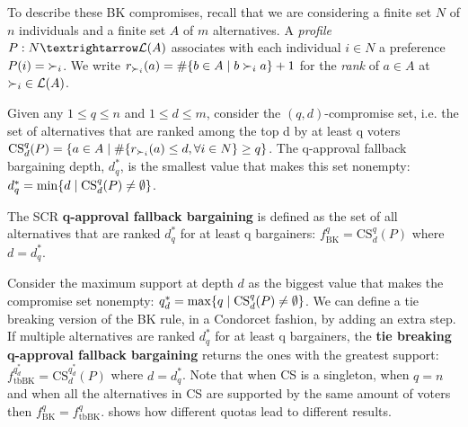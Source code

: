 To describe these BK compromises, recall that we are considering a finite set $N$ of $n$ individuals and a finite set $A$ of $m$ alternatives. A \emph{profile} $P: N → \linors$ associates with each individual $i \in N$ a preference $P(i) = {\prefi}$.
We write $r_{\prefi}(a)=\#\{b\in A \suchthat b \prefi a\}+1$ for the \emph{rank} of $a\in A$ at ${\prefi} \in \linors$.

Given any $ 1 \leq q \leq n$ and $1 \leq d \leq m$, consider the $(q, d)$-compromise set, i.e. the set of alternatives that are ranked among the top d by at least q voters $\text{CS}^{q}_{d}(P)=\{a \in A \suchthat \#\{r_{\prefi}(a) \leq d, \forall i \in N\} \geq q \}$.
The q-approval fallback bargaining depth, $d_{q}^{*}$, is the smallest value that makes this set nonempty: $d_{q}^{*}=\min\{d \suchthat \text{CS}^{q}_{d}(P) \neq \emptyset\}$.

The \acs{SCR} \textbf{q-approval fallback bargaining} is defined as the set of all alternatives that are ranked $d_{q}^{*}$ for at least q bargainers: $f_{\text{BK}}^{q}=\text{CS}^{q}_{d}(P)$ where $d=d_{q}^{*}$.

Consider the maximum support at depth $d$ as the biggest value that makes the compromise set nonempty: $q_{d}^{*}=\max\{q \suchthat \text{CS}^{q}_{d}(P) \neq \emptyset\}$.
We can define a tie breaking version of the BK rule, in a Condorcet fashion, by adding an extra step. If multiple alternatives are ranked $d_{q}^{*}$ for at least q bargainers, the \textbf{tie breaking q-approval fallback bargaining} returns the ones with the greatest support: $f_{\text{tbBK}}^{q_{d}^{*}}= \text{CS}^{q_{d}^{*}}_{d}(P)$ where $d=d_{q}^{*}$.
Note that when CS is a singleton, when $q=n$ and when all the alternatives in CS are supported by the same amount of voters then $f_{\text{BK}}^{q}=f_{\text{tbBK}}^{q}$.
 shows how different quotas lead to different results.


